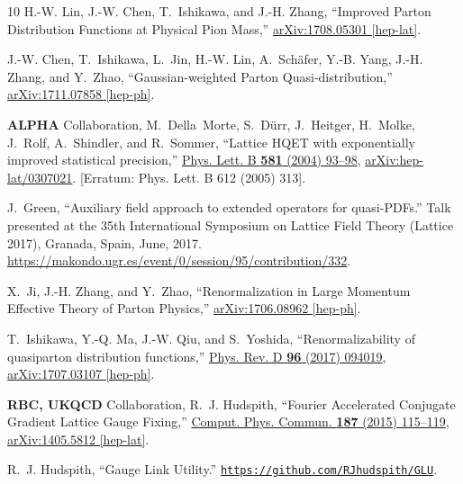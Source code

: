 \begin{thebibliography}{10}
H.-W. Lin, J.-W. Chen, T.~Ishikawa, and J.-H. Zhang, ``{Improved Parton
  Distribution Functions at Physical Pion Mass},''
\href{http://arxiv.org/abs/1708.05301}{{\ttfamily arXiv:1708.05301 [hep-lat]}}.

J.-W. Chen, T.~Ishikawa, L.~Jin, H.-W. Lin, A.~Schäfer, Y.-B. Yang, J.-H.
  Zhang, and Y.~Zhao, ``{Gaussian-weighted Parton Quasi-distribution},''
\href{http://arxiv.org/abs/1711.07858}{{\ttfamily arXiv:1711.07858 [hep-ph]}}.

{\bfseries ALPHA} Collaboration, M.~Della~Morte, S.~Dürr, J.~Heitger,
  H.~Molke, J.~Rolf, A.~Shindler, and R.~Sommer, ``{Lattice HQET with
  exponentially improved statistical precision},''
  \href{http://dx.doi.org/10.1016/j.physletb.2005.03.017}{Phys. Lett. B
  {\bfseries 581} (2004) 93--98},
  \href{http://arxiv.org/abs/hep-lat/0307021}{{\ttfamily
  arXiv:hep-lat/0307021}}.
[Erratum: Phys. Lett. B 612 (2005) 313].

J.~Green, ``{Auxiliary field approach to extended operators for quasi-PDFs}.''
  {Talk presented at the 35th International Symposium on Lattice Field Theory
  (Lattice 2017), Granada, Spain}, June, 2017.
\newblock \url{https://makondo.ugr.es/event/0/session/95/contribution/332}.

X.~Ji, J.-H. Zhang, and Y.~Zhao, ``{Renormalization in Large Momentum Effective
  Theory of Parton Physics},''
\href{http://arxiv.org/abs/1706.08962}{{\ttfamily arXiv:1706.08962 [hep-ph]}}.

T.~Ishikawa, Y.-Q. Ma, J.-W. Qiu, and S.~Yoshida, ``{Renormalizability of
  quasiparton distribution functions},''
  \href{http://dx.doi.org/10.1103/PhysRevD.96.094019}{Phys. Rev. D {\bfseries
  96} (2017) 094019},
\href{http://arxiv.org/abs/1707.03107}{{\ttfamily arXiv:1707.03107 [hep-ph]}}.

{\bfseries RBC, UKQCD} Collaboration, R.~J. Hudspith, ``{Fourier Accelerated
  Conjugate Gradient Lattice Gauge Fixing},''
  \href{http://dx.doi.org/10.1016/j.cpc.2014.10.017}{Comput. Phys. Commun.
  {\bfseries 187} (2015) 115--119},
\href{http://arxiv.org/abs/1405.5812}{{\ttfamily arXiv:1405.5812 [hep-lat]}}.

R.~J. Hudspith, ``{Gauge Link Utility}.''
  {{\href{https://github.com/RJhudspith/GLU}{\texttt{https://github.com/RJhudspith/GLU}}}}.


\end{thebibliography}
